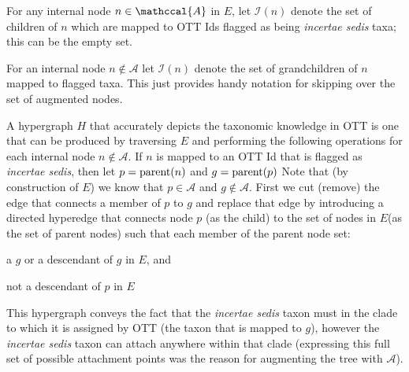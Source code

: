 \documentclass[11pt]{article}
\newcommand{\insed}{{\em incertae sedis}\xspace}
\newcommand{\augmentedFullTree}{\ensuremath{E}\xspace}
\newcommand{\specHyper}{\ensuremath{H}\xspace}
\newcommand{\insedChildren}[1]{\ensuremath{\mathcal{I}(#1)}\xspace}
\begin{document}
For any internal node $n\in\mathccal{A}$ in \augmentedFullTree, let \insedChildren{n}
     denote the set of children
    of $n$ which are mapped to OTT Ids flagged as being \insed taxa; this can be the empty set.

For an internal node $n\notin\mathcal{A}$ let \insedChildren{n} denote the set of grandchildren
    of $n$ mapped to flagged taxa. This just provides handy notation for skipping over the 
    set of augmented nodes.

A hypergraph \specHyper that accurately depicts the taxonomic knowledge in OTT is one that can be produced by
    traversing $\augmentedFullTree$ and performing the following operations for each internal node $n\notin \mathcal{A}$.
If $n$ is mapped to an OTT Id that is flagged as \insed, then let $p=\mbox{parent}(n)$ and $g=\mbox{parent}(p)$
Note that (by construction of \augmentedFullTree) we know that 
    $p\in\mathcal{A}$ and $g\notin\mathcal{A}$.
First we cut (remove) the edge that connects a member of $p$ to $g$
    and replace that edge by introducing a directed hyperedge that connects node
    $p$ (as the child) to the set of nodes in \augmentedFullTree (as the set of parent nodes)
    such that each member of the parent node set:
\begin{compactitem}
    \item a $g$ or a descendant of $g$ in $\augmentedFullTree$, and
    \item not a descendant of $p$ in $\augmentedFullTree$
\end{compactitem}
This hypergraph conveys the fact that the \insed taxon must in the clade to which it is 
    assigned by OTT (the taxon that is mapped to $g$),
    however the \insed taxon can attach anywhere within that clade (expressing
    this full set of possible attachment points was the reason for augmenting the tree
    with $\mathcal{A}$).
\end{document}
